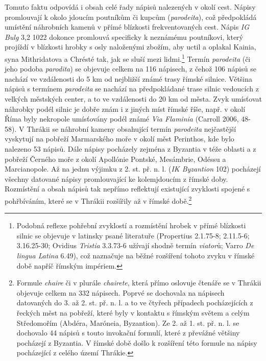 Tomuto faktu odpovídá i obsah celé řady nápisů nalezených v okolí cest. Nápisy promlouvají k okolo jdoucím poutníkům či kupcům ({\em parodeita}), což předpokládá umístění náhrobních kamenů v přímé blízkosti frekventovaných cest. Nápis {\em IG Bulg} 3,2 1022 dokonce promlouvá specificky k neznámému poutníkovi, který projíždí v blízkosti hrobky s osly naloženými zbožím, aby uctil a oplakal Kainia, syna Mithridatova a Chrésté tak, jak se sluší mezi lidmi.\footnote{Podobná reflexe pohřební zvyklostí a rozmístění hrobek v přímé blízkosti silnic se objevuje v latinsky psané literatuře (Propertius 2.1.75-8; 2.11.5-6; 3.16.25-30; Ovidius {\em Tristia} 3.3.73-6 užívají shodně termín {\em viator}ů; Varro {\em De lingua Latina} 6.49), což naznačuje na běžné rozšíření tohoto zvyku v římské době napříč římským impériem.} Termín {\em parodeita} (či jeho podoba {\em parodita}) se objevuje celkem na 116 nápisech, z čehož 106 nápisů se nachází ve vzdálenosti do 5 km od nejbližší známé trasy římské silnice. Většina nápisů s termínem {\em parodeita} se nachází na předpokládané trase silnic vedoucích z velkých městských center, a to ve vzdálenosti do 20 km od města. Zvyk umísťovat náhrobky podél silnic je dobře znám i z jiných míst římské říše, např. v okolí Říma byly nekropole umísťovány podél známé {\em Via Flaminia} (Carroll 2006, 48-58). V Thrákii se náhrobní kameny obsahující termín {\em parodeita} nejčastější vyskytují na pobřeží Marmarského moře v okolí měst Perinthos, kde bylo nalezeno 53 nápisů. Dále nápisy pocházely zejména z Byzantia v téže oblasti a z pobřeží Černého moře z okolí Apollónie Pontské, Mesámbrie, Odéssu a Marcianopole. Až na jednu výjimku z 2. st. př. n. l. ({\em IK Byzantion} 102) pocházejí všechny datované nápisy promlouvající ke kolemjdoucím z římské doby. Rozmístění a obsah nápisů tak nepřímo reflektují existující zvyklosti spojené s pohřbíváním, které se v Thrákii rozšířily až v římské době.\footnote{Formule {\em chaire} či v plurále {\em chairete}, která přímo oslovuje čtenáře se v Thrákii objevuje celkem na 332 nápisech. Poprvé se dochovala na nápisech datovaných do 3. až 2. st. př. n. l. a to ve čtyřech případech pocházejících z řeckých měst na pobřeží, které byly v kontaktu s římským světem a celým Středomořím (Abdéra, Maróneia, Byzantion). Ze 2. až 1. st. př. n. l. se dochovalo 44 nápisů s touto invokační formulí, které z převážné většiny pocházejí z Byzantia. V římské době došlo k rozšíření této formule na nápisy pocházející z celého území Thrákie.}

